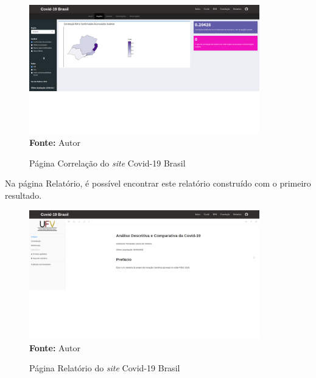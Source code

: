 \documentclass[
  fleqn,ebook]{ic}
\begin{document}
\begin{figure}[H]
    \centering
    \caption{Página Correlação do \textit{site} Covid-19 Brasil}
    \includegraphics[width=10cm]{img/regioescorr.png} \\
    {\footnotesize \textbf{Fonte: }Autor}
    \label{fig:regioescorr}
\end{figure}

Na página Relatório, é possível encontrar este relatório construído com o
primeiro resultado.

\begin{figure}[H]
    \centering
    \caption{Página Relatório do \textit{site} Covid-19 Brasil}
    \includegraphics[width=10cm]{img/relatorio.png} \\
    {\footnotesize \textbf{Fonte: }Autor}
    \label{fig:relatorio}
\end{figure}

\nocite{*}

  
\end{document}

